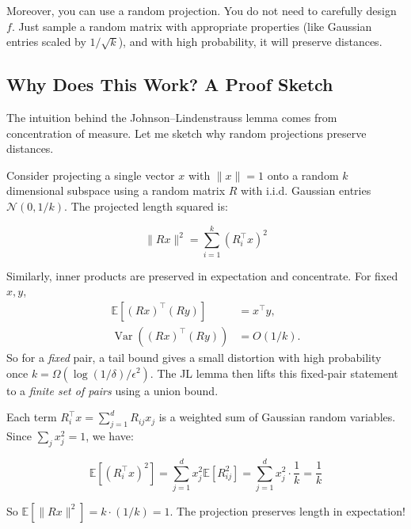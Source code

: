 \vspace{1em}

Moreover, you can use a random projection. You do not need to carefully design $f$. Just sample a random matrix with appropriate properties (like Gaussian entries scaled by $1/\sqrt{k}$), and with high probability, it will preserve distances.

\subsection{Why Does This Work? A Proof Sketch}
\label{sec:jl-proof}

The intuition behind the Johnson--Lindenstrauss lemma comes from concentration of measure. Let me sketch why random projections preserve distances.

\vspace{1em}

Consider projecting a single vector $x$ with $\|x\| = 1$ onto a random $k$ dimensional subspace using a random matrix $R$ with i.i.d. Gaussian entries $\mathcal{N}(0, 1/k)$. The projected length squared is:

\begin{equation}
\|Rx\|^2 = \sum_{i=1}^k (R_i^\top x)^2
\end{equation}

Similarly, inner products are preserved in expectation and concentrate. For fixed $x,y$,
\begin{equation*}
\begin{aligned}
\mathbb{E}[(Rx)^\top (Ry)] &= x^\top y,\\
\operatorname{Var}((Rx)^\top (Ry)) &= O(1/k).
\end{aligned}
\end{equation*}
So for a \emph{fixed} pair, a tail bound gives a small distortion with high probability once $k=\Omega(\log(1/\delta)/\epsilon^2)$. The JL lemma then lifts this fixed-pair statement to a \emph{finite set of pairs} using a union bound.

Each term $R_i^\top x = \sum_{j=1}^d R_{ij} x_j$ is a weighted sum of Gaussian random variables. Since $\sum_j x_j^2 = 1$, we have:

\begin{equation}
\mathbb{E}[(R_i^\top x)^2] = \sum_{j=1}^d x_j^2 \mathbb{E}[R_{ij}^2] = \sum_{j=1}^d x_j^2 \cdot \frac{1}{k} = \frac{1}{k}
\end{equation}

So $\mathbb{E}[\|Rx\|^2] = k \cdot (1/k) = 1$. The projection preserves length in expectation!

